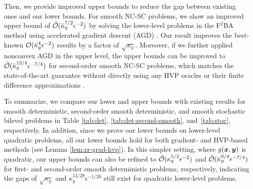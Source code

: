\documentclass{article}
\begin{document}
Then, we provide improved upper bounds to reduce the gap between existing ones and our lower bounds. For smooth NC-SC problems, we show an improved upper bound of $\tilde {{\mathcal{O}}}(\bar \kappa_y^{7/2} \epsilon^{-2})$ by solving the lower-level problems
in the F${}^2$BA method \citep{chen2023near} using accelerated gradient descent (AGD) \citep{nesterov1983method}. Our result improves the best-known ${\mathcal{O}}(\bar \kappa_y^4 \epsilon^{-2})$ results \citep{ji2021bilevel,arbel2022amortized,chen2023near} by a factor of $\sqrt{\kappa_y}$. Moreover, if we further applied nonconvex AGD \citep{li2023restarted} in the upper level, the upper bounds can be improved to 
$\tilde {{\mathcal{O}}}(\bar \kappa_y^{13/4} \epsilon^{-7/4})$ for second-order smooth NC-SC problems, which matches the state-of-the-art guarantee \citep{yang2023accelerating} without directly using any HVP oracles or their finite difference approximations \citep{yang2023achieving}.

To summarize, we compare our lower and upper bounds with existing results for smooth deterministic, second-order smooth deterministic, and smooth stochastic bilevel problems in Table \ref{tab:det}, \ref{tab:det-second-smooth}, and~\ref{tab:stoc},
respectively. 
In addition, since we prove our lower bounds on lower-level quadratic problems, all our lower bounds hold for both gradient- and HVP-based methods (see Lemma \ref{lem:zr-grad-hvp}). 
In this simpler setting, where $g({\bm{x}},{\bm{y}})$ is quadratic, our upper bounds can also be refined to 
$\tilde {{\mathcal{O}}}(\kappa_y^{5/2} \epsilon^{-2})$ and $\tilde {{\mathcal{O}}}(\bar \kappa_y^{9/4} \epsilon^{-7/4})$ for first- and second-order smooth deterministic problems, respectively, indicating the gaps of $\sqrt{\kappa_y}$ and $\kappa_y^{13/28} \epsilon^{-1/28}$ still exist for quadratic lower-level problems.



\end{document}
